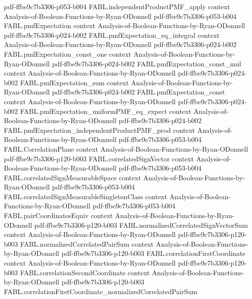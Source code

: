 \begin{theorem}
  {pdf-ffbe9c7b3306-p053-b004}
\proofstep
  {FABL.independentProductPMF_apply}
  {context}
  {Analysis-of-Boolean-Functions-by-Ryan-ODonnell}
  {pdf-ffbe9c7b3306-p053-b004}
\proofstep
  {FABL.pmfExpectation}
  {context}
  {Analysis-of-Boolean-Functions-by-Ryan-ODonnell}
  {pdf-ffbe9c7b3306-p024-b002}
\proofstep
  {FABL.pmfExpectation_eq_integral}
  {context}
  {Analysis-of-Boolean-Functions-by-Ryan-ODonnell}
  {pdf-ffbe9c7b3306-p024-b002}
\proofstep
  {FABL.pmfExpectation_const_one}
  {context}
  {Analysis-of-Boolean-Functions-by-Ryan-ODonnell}
  {pdf-ffbe9c7b3306-p024-b002}
\proofstep
  {FABL.pmfExpectation_const_mul}
  {context}
  {Analysis-of-Boolean-Functions-by-Ryan-ODonnell}
  {pdf-ffbe9c7b3306-p024-b002}
\proofstep
  {FABL.pmfExpectation_sum}
  {context}
  {Analysis-of-Boolean-Functions-by-Ryan-ODonnell}
  {pdf-ffbe9c7b3306-p024-b002}
\proofstep
  {FABL.pmfExpectation_const}
  {context}
  {Analysis-of-Boolean-Functions-by-Ryan-ODonnell}
  {pdf-ffbe9c7b3306-p024-b002}
\proofstep
  {FABL.pmfExpectation_uniformPMF_eq_expect}
  {context}
  {Analysis-of-Boolean-Functions-by-Ryan-ODonnell}
  {pdf-ffbe9c7b3306-p024-b002}
\proofstep
  {FABL.pmfExpectation_independentProductPMF_prod}
  {context}
  {Analysis-of-Boolean-Functions-by-Ryan-ODonnell}
  {pdf-ffbe9c7b3306-p053-b004}
\proofstep
  {FABL.CorrelationPlane}
  {context}
  {Analysis-of-Boolean-Functions-by-Ryan-ODonnell}
  {pdf-ffbe9c7b3306-p120-b003}
\proofstep
  {FABL.correlatedSignVector}
  {context}
  {Analysis-of-Boolean-Functions-by-Ryan-ODonnell}
  {pdf-ffbe9c7b3306-p053-b004}
\proofstep
  {FABL.correlatedSignMeasurableSpace}
  {context}
  {Analysis-of-Boolean-Functions-by-Ryan-ODonnell}
  {pdf-ffbe9c7b3306-p053-b004}
\proofstep
  {FABL.correlatedSignMeasurableSingletonClass}
  {context}
  {Analysis-of-Boolean-Functions-by-Ryan-ODonnell}
  {pdf-ffbe9c7b3306-p053-b004}
\proofstep
  {FABL.pairCoordinatesEquiv}
  {context}
  {Analysis-of-Boolean-Functions-by-Ryan-ODonnell}
  {pdf-ffbe9c7b3306-p120-b003}
\proofstep
  {FABL.normalizedCorrelatedSignVectorSum}
  {context}
  {Analysis-of-Boolean-Functions-by-Ryan-ODonnell}
  {pdf-ffbe9c7b3306-p120-b003}
\proofstep
  {FABL.normalizedCorrelatedPairSum}
  {context}
  {Analysis-of-Boolean-Functions-by-Ryan-ODonnell}
  {pdf-ffbe9c7b3306-p120-b003}
\proofstep
  {FABL.correlationFirstCoordinate}
  {context}
  {Analysis-of-Boolean-Functions-by-Ryan-ODonnell}
  {pdf-ffbe9c7b3306-p120-b003}
\proofstep
  {FABL.correlationSecondCoordinate}
  {context}
  {Analysis-of-Boolean-Functions-by-Ryan-ODonnell}
  {pdf-ffbe9c7b3306-p120-b003}
\proofstep
  {FABL.correlationFirstCoordinate_normalizedCorrelatedPairSum}

\end{theorem}
